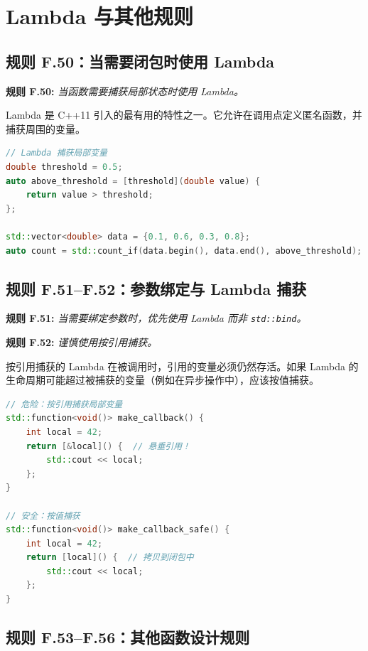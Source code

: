 \section{Lambda 与其他规则}

\subsection{规则 F.50：当需要闭包时使用 Lambda}

\textbf{规则 F.50:} \textit{当函数需要捕获局部状态时使用 Lambda。}

Lambda 是 C++11 引入的最有用的特性之一。它允许在调用点定义匿名函数，并捕获周围的变量。

\begin{lstlisting}[language=C++]
// Lambda 捕获局部变量
double threshold = 0.5;
auto above_threshold = [threshold](double value) {
    return value > threshold;
};

std::vector<double> data = {0.1, 0.6, 0.3, 0.8};
auto count = std::count_if(data.begin(), data.end(), above_threshold);
\end{lstlisting}

\subsection{规则 F.51--F.52：参数绑定与 Lambda 捕获}

\textbf{规则 F.51:} \textit{当需要绑定参数时，优先使用 Lambda 而非 \texttt{std::bind}。}

\textbf{规则 F.52:} \textit{谨慎使用按引用捕获。}

按引用捕获的 Lambda 在被调用时，引用的变量必须仍然存活。如果 Lambda 的生命周期可能超过被捕获的变量（例如在异步操作中），应该按值捕获。

\begin{lstlisting}[language=C++]
// 危险：按引用捕获局部变量
std::function<void()> make_callback() {
    int local = 42;
    return [&local]() {  // 悬垂引用！
        std::cout << local;
    };
}

// 安全：按值捕获
std::function<void()> make_callback_safe() {
    int local = 42;
    return [local]() {  // 拷贝到闭包中
        std::cout << local;
    };
}
\end{lstlisting}

\subsection{规则 F.53--F.56：其他函数设计规则}

